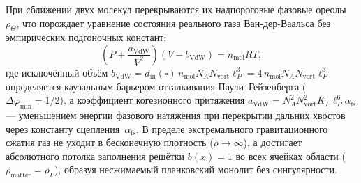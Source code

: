 При сближении двух молекул перекрываются их надпороговые фазовые ореолы~$\rho_\Theta$, что порождает уравнение состояния реального газа Ван-дер-Ваальса без эмпирических подгоночных констант:
\[
  \left(P + \frac{a_{\mathrm{VdW}}}{V^2}\right)(V - b_{\mathrm{VdW}}) = n_{\mathrm{mol}}RT,
\]
где исключённый объём $b_{\mathrm{VdW}} = d_{\mathrm{in}}(\square)\,n_{\mathrm{mol}}N_A N_{\mathrm{vort}}\ell_P^3 = 4\,n_{\mathrm{mol}}N_A N_{\mathrm{vort}}\ell_P^3$ определяется каузальным барьером отталкивания Паули--Гейзенберга ($\Delta\varphi_{\min}=1/2$), а коэффициент когезионного притяжения $a_{\mathrm{VdW}} = N_A^2 N_{\mathrm{vort}}^2 K_P \ell_P^6 \alpha_{\mathrm{fs}}$ --- уменьшением энергии фазового натяжения при перекрытии дальних хвостов через константу сцепления~$\alpha_{\mathrm{fs}}$.
В пределе экстремального гравитационного сжатия газ не уходит в бесконечную плотность ($\rho\to\infty$), а достигает абсолютного потолка заполнения решётки $b(x) = 1$ во всех ячейках области ($\rho_{\mathrm{matter}} = \rho_P$), образуя несжимаемый планковский монолит без сингулярности.
